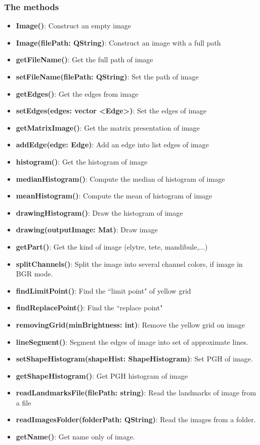 \subsubsection{The methods}
\begin{itemize}
\item\textbf{Image()}: Construct an empty image
\item\textbf{Image(filePath: QString)}: Construct an image with a full path
\item\textbf{getFileName()}: Get the full path of image
\item\textbf{setFileName(filePath: QString)}: Set the path of image
\item\textbf{getEdges()}: Get the edges from image
\item\textbf{setEdges(edges: vector \textless Edge\textgreater)}: Set the edges of image
\item\textbf{getMatrixImage()}: Get the matrix presentation of image
\item\textbf{addEdge(edge: Edge)}: Add an edge into list edges of image
\item\textbf{histogram()}: Get the histogram of image
\item\textbf{medianHistogram()}: Compute the median of histogram of image
\item\textbf{meanHistogram()}: Compute the mean of histogram of image
\item\textbf{drawingHistogram()}: Draw the histogram of image
\item\textbf{drawing(outputImage: Mat)}: Draw image
\item\textbf{getPart()}: Get the kind of image (elytre, tete, mandibule,...)
\item\textbf{splitChannels()}:  Split the image into several channel colors, if image in BGR mode.
\item\textbf{findLimitPoint()}: Find the ``limit point" of yellow grid
\item\textbf{findReplacePoint()}: Find the ``replace point"
\item\textbf{removingGrid(minBrightness: int)}: Remove the yellow grid on image
\item\textbf{lineSegment()}: Segment the edges of image into set of approximate lines.
\item\textbf{setShapeHistogram(shapeHist: ShapeHistogram)}: Set PGH of image.
\item\textbf{getShapeHistogram()}: Get PGH histogram of image
\item\textbf{readLandmarksFile(filePath: string)}: Read the landmarks of image from a file
\item\textbf{readImagesFolder(folderPath: QString)}: Read the images from a folder.
\item\textbf{getName()}: Get name only of image.
\end{itemize}
